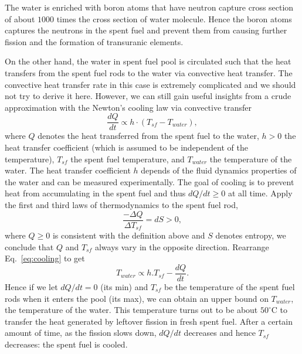 \documentclass[nofootinbib,preprint,aps]{revtex4-1}
\begin{document}
    The water is enriched with boron atoms that have neutron capture cross section of about $1000$ times
    the cross section of water molecule. Hence the boron atoms captures the neutrons in the spent fuel
    and prevent them from causing further fission and the formation of transuranic elements.

    On the other hand, the water in spent fuel pool is circulated such that the heat transfers from the spent
    fuel rods to the water via convective heat transfer. The convective heat transfer rate in this case is
    extremely complicated and we should not try to derive it here. However, we can still gain useful insights
    from a crude approximation with the Newton's cooling law via convective transfer
    \begin{equation}
        \label{eq:cooling}
        \frac{dQ}{dt} \propto h\cdot (T_{sf} - T_{water}),
    \end{equation}
    where $Q$ denotes the heat transferred from the spent fuel to the water,
    $h>0$ the heat transfer coefficient (which is assumed to be independent
    of the temperature), $T_{sf}$ the spent fuel temperature, and $T_{water}$ the temperature
    of the water.
    The heat transfer coefficient $h$ depends of the fluid dynamics properties of the water and can
    be measured experimentally. The goal of
    cooling is to prevent heat from accumulating in the spent fuel and thus $dQ/dt \geq 0$ at all time.
    Apply the first and third laws of thermodynamics to the spent fuel rod,
    \begin{equation}
        \label{eq:first}
        \frac{-\Delta Q}{\Delta T_{sf}} = dS > 0,
    \end{equation}
    where $Q\geq 0$ is consistent with the definition above and $S$ denotes entropy, we conclude that $Q$ and $T_{sf}$ always vary in the opposite direction. Rearrange Eq.~\ref{eq:cooling} to get
    \begin{equation}
        T_{water} \propto h.T_{sf} - \frac{dQ}{dt}.
    \end{equation}
    Hence if we let $dQ/dt=0$ (its min) and $T_{sf}$ be the temperature of the spent
    fuel rods when it enters the pool (its max), we
    can obtain an upper bound on $T_{water}$, the temperature of the water. This temperature turns out to
    be about $50^{\circ}$C to transfer the heat generated by leftover fission in fresh spent fuel. After a
    certain amount of time, as the fission slows down, $dQ/dt$ decreases and hence $T_{sf}$ decreases: the spent
    fuel is cooled.
\end{document}
